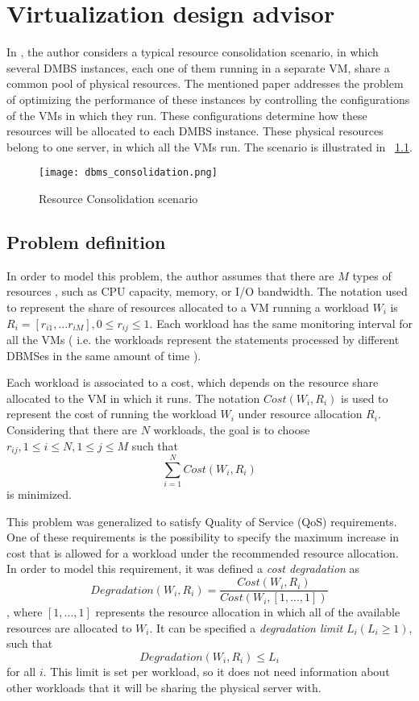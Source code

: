 \chapter{\textbf{Virtualization design advisor}}

\label{Virtualization design advisor}


In \cite{Soror:2008:AVM:1376616.1376711}, the author considers a typical resource consolidation scenario, in which several DMBS instances, each one of them running in a separate VM, share a common pool of physical resources. The mentioned paper addresses the problem of optimizing the performance of these instances by controlling the configurations of the VMs in which they run. These configurations determine how these resources will be allocated to each DMBS instance. These physical resources belong to one server, in which all the VMs run. The scenario is illustrated in ~\ref{fig:scenario}.


\begin{figure}[ht]
\centering
\texttt{[image: dbms\_consolidation.png]}
\caption{Resource Consolidation scenario}
\label{fig:scenario}
\end{figure} 

\section{Problem definition}

In order to model this problem, the author assumes that there are  $M$ types of resources , such as CPU capacity, memory, or I/O bandwidth. The notation used to represent the share of resources allocated to a VM running a workload $W_{i}$ is $R_{i} = [r_{i1},...r_{iM}], 0 \leq r_{ij} \leq 1$. Each workload has the same monitoring interval for all the VMs ( i.e. the workloads represent the statements processed by different DBMSes in the same amount of time ).

Each workload is associated to a cost, which depends on the resource share allocated to the VM in which it runs. The notation $Cost(W_{i},R_{i})$ is used to represent the cost of running the workload $W_{i}$ under resource allocation $R_{i}$. Considering that there are $N$ workloads, the goal is to choose $r_{ij}, 1 \leq i \leq N, 1 \leq j \leq M$ such that 
\[
  \sum_{i=1}^{N} Cost(W_{i},R_{i})
\]
is minimized.

This problem was generalized to satisfy Quality of Service (QoS) requirements. One of these requirements is the possibility to specify the maximum increase in cost that is allowed for a workload under the recommended resource allocation. In order to model this requirement, it was defined a \textit{cost degradation} as
\[
 Degradation(W_{i},R_{i}) = \frac{Cost(W_{i},R_{i})}{Cost(W_{i},[1,...,1])}
\]
, where $[1,...,1]$ represents the resource allocation in which all of the available resources are allocated to $W_{i}$. It can be specified a \textit{degradation limit} $L_{i} ( L_{i} \geq 1 )$, such that 
\[
 Degradation(W_{i}, R_{i}) \leq L_{i}
\]
for all $i$. This limit is set per workload, so it does not need information about other workloads that it will be sharing the physical server with.

